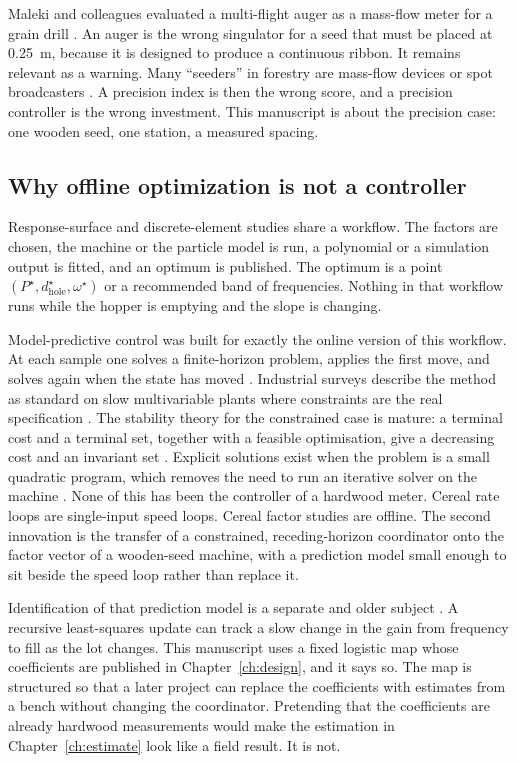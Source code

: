 Maleki and colleagues evaluated a multi-flight auger as a mass-flow meter for a grain drill \cite{maleki2006}. An auger is the wrong singulator for a seed that must be placed at 0.25~m, because it is designed to produce a continuous ribbon. It remains relevant as a warning. Many ``seeders'' in forestry are mass-flow devices or spot broadcasters \cite{newforest}. A precision index is then the wrong score, and a precision controller is the wrong investment. This manuscript is about the precision case: one wooden seed, one station, a measured spacing.

\subsection{Why offline optimization is not a controller}

Response-surface and discrete-element studies share a workflow. The factors are chosen, the machine or the particle model is run, a polynomial or a simulation output is fitted, and an optimum is published. The optimum is a point $(P^{\star}, d_{\mathrm{hole}}^{\star}, \omega^{\star})$ or a recommended band of frequencies. Nothing in that workflow runs while the hopper is emptying and the slope is changing.

Model-predictive control was built for exactly the online version of this workflow. At each sample one solves a finite-horizon problem, applies the first move, and solves again when the state has moved \cite{garcia1989,clarke1987,camacho2007,maciejowski2002,rawlings2017}. Industrial surveys describe the method as standard on slow multivariable plants where constraints are the real specification \cite{qin2003}. The stability theory for the constrained case is mature: a terminal cost and a terminal set, together with a feasible optimisation, give a decreasing cost and an invariant set \cite{mayne2000}. Explicit solutions exist when the problem is a small quadratic program, which removes the need to run an iterative solver on the machine \cite{bemporad2002,boyd2004}. None of this has been the controller of a hardwood meter. Cereal rate loops are single-input speed loops. Cereal factor studies are offline. The second innovation is the transfer of a constrained, receding-horizon coordinator onto the factor vector of a wooden-seed machine, with a prediction model small enough to sit beside the speed loop rather than replace it.

Identification of that prediction model is a separate and older subject \cite{ljung1999,kalman1960,welch1995}. A recursive least-squares update can track a slow change in the gain from frequency to fill as the lot changes. This manuscript uses a fixed logistic map whose coefficients are published in Chapter~\ref{ch:design}, and it says so. The map is structured so that a later project can replace the coefficients with estimates from a bench without changing the coordinator. Pretending that the coefficients are already hardwood measurements would make the estimation in Chapter~\ref{ch:estimate} look like a field result. It is not.

